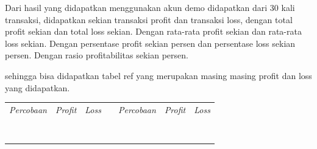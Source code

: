 Dari hasil yang didapatkan menggunakan akun demo didapatkan dari 30 kali transaksi, didapatkan sekian transaksi profit dan transaksi loss, dengan total profit sekian dan total loss sekian. Dengan rata-rata profit sekian dan rata-rata loss sekian. Dengan persentase profit sekian persen dan persentase loss sekian persen. Dengan rasio profitabilitas sekian persen.

sehingga bisa didapatkan tabel ref yang merupakan masing masing profit dan loss yang didapatkan. 

\begin{table}[H]
  \centering
  \begin{tabular}{|c|c|l|l|l|l|l|}
  \cline{1-3} \cline{5-7}
  \textit{Percobaan}     & \textit{Profit}       & \textit{Loss} &  & \multicolumn{1}{c|}{\textit{Percobaan}} & \multicolumn{1}{c|}{\textit{Profit}} & \textit{Loss} \\ \cline{1-3} \cline{5-7} 
                         &                       &               &  &                                         &                                      &               \\ \cline{1-3} \cline{5-7} 
                         &                       &               &  &                                         &                                      &               \\ \cline{1-3} \cline{5-7} 
                         &                       &               &  &                                         &                                      &               \\ \cline{1-3} \cline{5-7} 
                         &                       &               &  &                                         &                                      &               \\ \cline{1-3} \cline{5-7} 
                         &                       &               &  &                                         &                                      &               \\ \cline{1-3} \cline{5-7} 
                         &                       &               &  &                                         &                                      &               \\ \cline{1-3} \cline{5-7} 
                         &                       &               &  &                                         &                                      &               \\ \cline{1-3} \cline{5-7} 
                         &                       &               &  &                                         &                                      &               \\ \cline{1-3} \cline{5-7} 

\end{tabular}
\end{table}
